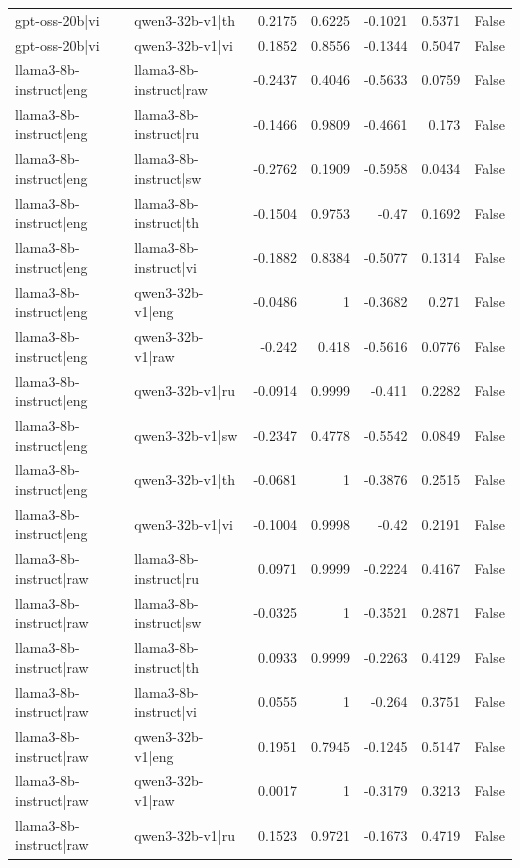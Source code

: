 \begin{table}
\begin{tabular}{l l r r r r l}
gpt-oss-20b|vi & qwen3-32b-v1|th & 0.2175 & 0.6225 & -0.1021 & 0.5371 & False \\
gpt-oss-20b|vi & qwen3-32b-v1|vi & 0.1852 & 0.8556 & -0.1344 & 0.5047 & False \\
llama3-8b-instruct|eng & llama3-8b-instruct|raw & -0.2437 & 0.4046 & -0.5633 & 0.0759 & False \\
llama3-8b-instruct|eng & llama3-8b-instruct|ru & -0.1466 & 0.9809 & -0.4661 & 0.173 & False \\
llama3-8b-instruct|eng & llama3-8b-instruct|sw & -0.2762 & 0.1909 & -0.5958 & 0.0434 & False \\
llama3-8b-instruct|eng & llama3-8b-instruct|th & -0.1504 & 0.9753 & -0.47 & 0.1692 & False \\
llama3-8b-instruct|eng & llama3-8b-instruct|vi & -0.1882 & 0.8384 & -0.5077 & 0.1314 & False \\
llama3-8b-instruct|eng & qwen3-32b-v1|eng & -0.0486 & 1 & -0.3682 & 0.271 & False \\
llama3-8b-instruct|eng & qwen3-32b-v1|raw & -0.242 & 0.418 & -0.5616 & 0.0776 & False \\
llama3-8b-instruct|eng & qwen3-32b-v1|ru & -0.0914 & 0.9999 & -0.411 & 0.2282 & False \\
llama3-8b-instruct|eng & qwen3-32b-v1|sw & -0.2347 & 0.4778 & -0.5542 & 0.0849 & False \\
llama3-8b-instruct|eng & qwen3-32b-v1|th & -0.0681 & 1 & -0.3876 & 0.2515 & False \\
llama3-8b-instruct|eng & qwen3-32b-v1|vi & -0.1004 & 0.9998 & -0.42 & 0.2191 & False \\
llama3-8b-instruct|raw & llama3-8b-instruct|ru & 0.0971 & 0.9999 & -0.2224 & 0.4167 & False \\
llama3-8b-instruct|raw & llama3-8b-instruct|sw & -0.0325 & 1 & -0.3521 & 0.2871 & False \\
llama3-8b-instruct|raw & llama3-8b-instruct|th & 0.0933 & 0.9999 & -0.2263 & 0.4129 & False \\
llama3-8b-instruct|raw & llama3-8b-instruct|vi & 0.0555 & 1 & -0.264 & 0.3751 & False \\
llama3-8b-instruct|raw & qwen3-32b-v1|eng & 0.1951 & 0.7945 & -0.1245 & 0.5147 & False \\
llama3-8b-instruct|raw & qwen3-32b-v1|raw & 0.0017 & 1 & -0.3179 & 0.3213 & False \\
llama3-8b-instruct|raw & qwen3-32b-v1|ru & 0.1523 & 0.9721 & -0.1673 & 0.4719 & False \\

\end{tabular}
\end{table}
